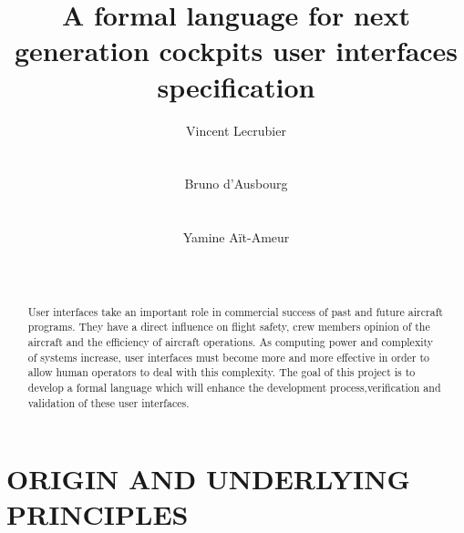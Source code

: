 \documentclass{sigchi}
\begin{document}
\title{A formal language for next generation cockpits user interfaces specification}


\author{
  \alignauthor Vincent Lecrubier\\
    \\
    \\
  \alignauthor Bruno d'Ausbourg\\
    \\
    \\
  \alignauthor Yamine A\"it-Ameur\\
    \\
    \\
}


\maketitle

\begin{abstract}
  User interfaces take an important role in commercial success of past and future aircraft programs. They have a direct influence on flight safety, crew members opinion of the aircraft and the efficiency of aircraft operations. 
As computing power and complexity of systems increase, user interfaces must become more and more effective in order to allow human operators to deal with this complexity. The goal of this project is to develop a formal language which will enhance the development process,verification and validation of these user interfaces.
\end{abstract}




\section{ORIGIN AND UNDERLYING PRINCIPLES}
  
\end{document}
